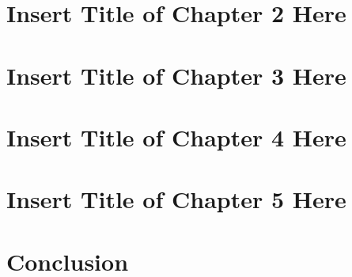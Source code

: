 \documentclass[
]{article}
\begin{document}
\clearpage

\section{Insert Title of Chapter 2 Here}\label{insert-title-of-chapter-2-here}

\renewcommand{\thefigure}{2.\arabic{figure}}
\setcounter{figure}{0}
\renewcommand{\thetable}{2.\arabic{table}}
\setcounter{table}{0}
\renewcommand{\theequation}{2.\arabic{equation}}
\setcounter{equation}{0}

\clearpage

\section{Insert Title of Chapter 3 Here}\label{insert-title-of-chapter-3-here}

\renewcommand{\thefigure}{3.\arabic{figure}}
\setcounter{figure}{0}
\renewcommand{\thetable}{3.\arabic{table}}
\setcounter{table}{0}
\renewcommand{\theequation}{3.\arabic{equation}}
\setcounter{equation}{0}

\clearpage

\section{Insert Title of Chapter 4 Here}\label{insert-title-of-chapter-4-here}

\renewcommand{\thefigure}{4.\arabic{figure}}
\setcounter{figure}{0}
\renewcommand{\thetable}{4.\arabic{table}}
\setcounter{table}{0}
\renewcommand{\theequation}{4.\arabic{equation}}
\setcounter{equation}{0}

\clearpage

\section{Insert Title of Chapter 5 Here}\label{insert-title-of-chapter-5-here}

\renewcommand{\thefigure}{5.\arabic{figure}}
\setcounter{figure}{0}
\renewcommand{\thetable}{5.\arabic{table}}
\setcounter{table}{0}
\renewcommand{\theequation}{5.\arabic{equation}}
\setcounter{equation}{0}

\clearpage

\section{Conclusion}\label{conclusion}
\end{document}
